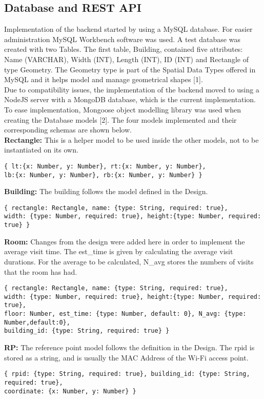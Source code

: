 \subsection{Database and REST API}
Implementation of the backend started by using a MySQL database. For easier administration MySQL Workbench software was used. A test database was created with two Tables. The first table, Building, contained five attributes: Name (VARCHAR), Width (INT), Length (INT), ID (INT) and Rectangle of type Geometry. The Geometry type is part of the Spatial Data Types offered in MySQL and it helps model and manage geometrical shapes [1].
\\
Due to compatibility issues, the implementation of the backend moved to using a NodeJS server with a MongoDB database, which is the current implementation.
To ease implementation, Mongoose object modelling library was used when creating the Database models [2]. The four models implemented and their corresponding schemas are shown below. 
\\
\textbf{Rectangle:}
This is a helper model to be used inside the other models, not to be instantiated on its own.
\begin{lstlisting}
{ lt:{x: Number, y: Number}, rt:{x: Number, y: Number}, 
lb:{x: Number, y: Number}, rb:{x: Number, y: Number} }	
\end{lstlisting}

\noindent
\textbf{Building:}
The building follows the model defined in the Design. 
\begin{lstlisting}
{ rectangle: Rectangle, name: {type: String, required: true},
width: {type: Number, required: true}, height:{type: Number, required: true} }
\end{lstlisting}

\noindent
\textbf{Room:}
Changes from the design were added here in order to implement the average visit time. The est\_time is given by calculating the average visit durations. For the average to be calculated, N\_avg stores the numbers of visits that the room has had.
\begin{lstlisting}
{ rectangle: Rectangle, name: {type: String, required: true},
width: {type: Number, required: true}, height:{type: Number, required: true},
floor: Number, est_time: {type: Number, default: 0}, N_avg: {type: Number,default:0},
building_id: {type: String, required: true} }
\end{lstlisting}

\noindent
\textbf{RP:}
The reference point model follows the definition in the Design. The rpid is stored as a string, and is usually the MAC Address of the Wi-Fi access point.
\begin{lstlisting}
{ rpid: {type: String, required: true}, building_id: {type: String, required: true},
coordinate: {x: Number, y: Number} }
\end{lstlisting}

